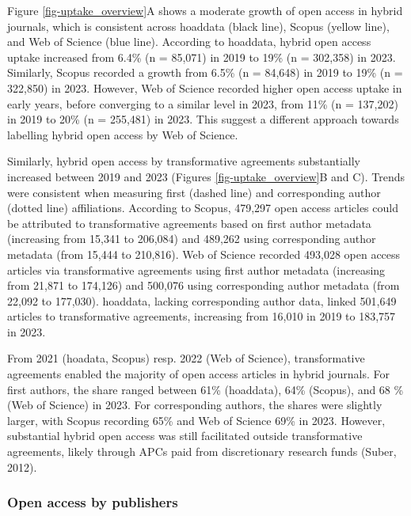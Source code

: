 \documentclass[a4paper,man,floatsintext,longtable,noextraspace,10pt]{apa6}
\begin{document}
Figure \ref{fig-uptake_overview}A shows a moderate growth of open access
in hybrid journals, which is consistent across hoaddata (black line),
Scopus (yellow line), and Web of Science (blue line). According to
hoaddata, hybrid open access uptake increased from 6.4\% (n = 85,071) in
2019 to 19\% (n = 302,358) in 2023. Similarly, Scopus recorded a growth
from 6.5\% (n = 84,648) in 2019 to 19\% (n = 322,850) in 2023. However,
Web of Science recorded higher open access uptake in early years, before
converging to a similar level in 2023, from 11\% (n = 137,202) in 2019
to 20\% (n = 255,481) in 2023. This suggest a different approach towards
labelling hybrid open access by Web of Science.

Similarly, hybrid open access by transformative agreements substantially
increased between 2019 and 2023 (Figures \ref{fig-uptake_overview}B and
C). Trends were consistent when measuring first (dashed line) and
corresponding author (dotted line) affiliations. According to Scopus,
479,297 open access articles could be attributed to transformative
agreements based on first author metadata (increasing from 15,341 to
206,084) and 489,262 using corresponding author metadata (from 15,444 to
210,816). Web of Science recorded 493,028 open access articles via
transformative agreements using first author metadata (increasing from
21,871 to 174,126) and 500,076 using corresponding author metadata (from
22,092 to 177,030). hoaddata, lacking corresponding author data, linked
501,649 articles to transformative agreements, increasing from 16,010 in
2019 to 183,757 in 2023.

From 2021 (hoadata, Scopus) resp. 2022 (Web of Science), transformative
agreements enabled the majority of open access articles in hybrid
journals. For first authors, the share ranged between 61\% (hoaddata),
64\% (Scopus), and 68 \% (Web of Science) in 2023. For corresponding
authors, the shares were slightly larger, with Scopus recording 65\% and
Web of Science 69\% in 2023. However, substantial hybrid open access was
still facilitated outside transformative agreements, likely through APCs
paid from discretionary research funds (Suber, 2012).

\subsubsection{Open access by
publishers}\label{open-access-by-publishers}
\end{document}
